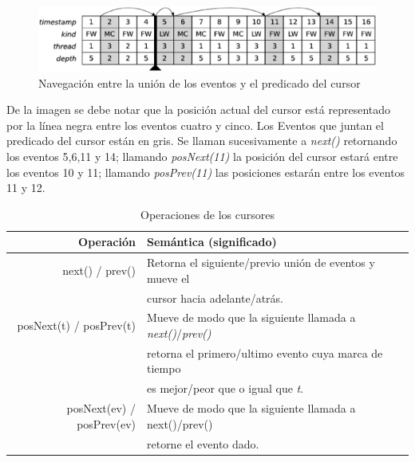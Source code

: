 \documentclass[12pt,legalpaper]{report}
\begin{document}
\begin{figure}[hpb]
	\centering
	\includegraphics[scale=0.4]{images/TOD/CursorExample.eps}
	\caption{Navegación entre la unión de los eventos y el predicado del cursor}
	\label{cursorExample}
\end{figure}

De la imagen se debe notar que la posición actual del cursor está representado por la línea negra entre los eventos cuatro y cinco.  Los Eventos que juntan el predicado del cursor están en gris.  Se llaman sucesivamente a \textit{next()} retornando los eventos 5,6,11 y 14;  llamando \textit{posNext(11)} la posición del cursor estará entre los eventos 10 y 11; llamando \textit{posPrev(11)} las posiciones estarán entre los eventos 11 y 12.

\begin{table}[!h]
\begin{center}
\begin{tabular}{| r | l |}
\hline
\rowcolor[gray]{0.9}Operación & Semántica (significado)\\
\hline
next() / prev() & Retorna el siguiente/previo unión de eventos y mueve el \\
                       & cursor hacia adelante/atrás.\\
\hline
posNext(t) / posPrev(t) & Mueve de modo que la siguiente llamada a \textit{next()}/\textit{prev()}\\
                                     & retorna el primero/ultimo evento cuya marca de tiempo \\
                                     & es mejor/peor que o igual que \textit{t}.\\
\hline
posNext(ev) / posPrev(ev) & Mueve de modo que la siguiente llamada a next()/prev()\\
                                           & retorne el evento dado.\\
\hline
\end{tabular}
\caption{Operaciones de los cursores}
\label{operacionesCursores}
\end{center}
\end{table}
\end{document}
